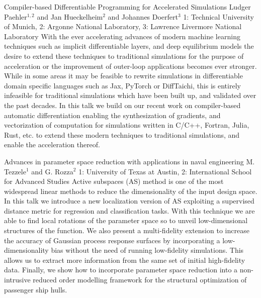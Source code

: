 \vspace{1.5ex}
\abs
{Compiler-based Differentiable Programming for Accelerated Simulations}
{Ludger Paehler$^{1,2}$ and Jan Hueckelheim$^{2}$ and Johannes Doerfert$^{3}$}
{1: Technical University of Munich, 2: Argonne National Laboratory, 3: Lawrence Livermore National Laboratory}
{With the ever accelerating advances of modern machine learning techniques such as implicit differentiable layers, and deep equilibrium models the desire to extend these techniques to traditional simulations for the purpose of acceleration or the improvement of outer-loop applications becomes ever stronger. While in some areas it may be feasible to rewrite simulations in differentiable domain specific languages such as Jax, PyTorch or DiffTaichi, this is entirely infeasible for traditional simulations which have been built up, and validated over the past decades. In this talk we build on our recent work on compiler-based automatic differentiation enabling the synthesization of gradients, and vectorization of computation for simulations written in C/C++, Fortran, Julia, Rust, etc. to extend these modern techniques to traditional simulations, and enable the acceleration thereof.}


\vspace{1.5ex}
\abs
{Advances in parameter space reduction with applications in naval engineering}
{M. Tezzele$^{1}$ and G. Rozza$^{2}$}
{1: University of Texas at Austin, 2: International School for Advanced Studies}
{Active subspaces (AS) method is one of the most widespread linear methods to reduce the dimensionality of the input design space. In this talk we introduce a new localization version of AS exploiting a supervised distance metric for regression and classification tasks. With this technique we are able to find local rotations of the parameter space so to unveil low-dimensional structures of the function. We also present a multi-fidelity extension to increase the accuracy of Gaussian process response surfaces by incorporating a low-dimensionality bias without the need of running low-fidelity simulations. This allows us to extract more information from the same set of initial high-fidelity data. Finally, we show how to incorporate parameter space reduction into a non-intrusive reduced order modelling framework for the structural optimization of passenger ship hulls.}


